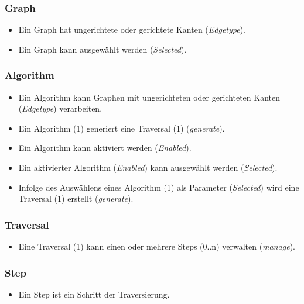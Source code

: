 \subsubsection{Graph}
\label{subsubsec:Graph}
\begin{itemize}
  \item Ein Graph hat ungerichtete oder gerichtete Kanten (\textit{Edgetype}).
  \item Ein Graph kann ausgew\"ahlt werden (\textit{Selected}).
\end{itemize}
% 
\subsubsection{Algorithm}
\label{subsubsec:Algorithm}
\begin{itemize}
  \item Ein Algorithm kann Graphen mit ungerichteten oder gerichteten Kanten (\textit{Edgetype}) verarbeiten.
  \item Ein Algorithm (1) generiert eine Traversal (1) (\textit{generate}).
  \item Ein Algorithm kann aktiviert werden (\textit{Enabled}).
  \item Ein aktivierter Algorithm (\textit{Enabled}) kann ausgew\"ahlt werden (\textit{Selected}).
  \item Infolge des Ausw\"ahlens eines Algorithm (1) als Parameter (\textit{Selected}) wird eine Traversal (1) erstellt (\textit{generate}).
\end{itemize}
% 
\subsubsection{Traversal}
\label{subsubsec:Traversal}
\begin{itemize}
  \item Eine Traversal (1) kann einen oder mehrere Steps (0..n) verwalten (\textit{manage}).
\end{itemize}

\subsubsection{Step}
\label{subsubsec:Step}
\begin{itemize}
  \item Ein Step ist ein Schritt der Traversierung.
\end{itemize}

